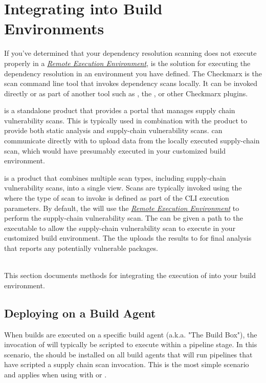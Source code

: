 \chapter{Integrating \scaresolver into Build Environments}\label{chap:ext_build_env}

If you've determined that your dependency resolution scanning does not execute properly
in a \hyperref[sssec:remote_environment]{\textit{Remote Execution Environment}}, \scaresolver
is the solution for executing the dependency resolution in an environment you have defined.
The Checkmarx \scaresolver is the scan command line tool that invokes 
dependency scans locally.  It can be invoked directly or as part of another
tool such as \cxflow, the \cxonecli, or other Checkmarx plugins.

\cxsca is a standalone product that provides a portal that manages supply chain vulnerability scans.  This is
typically used in combination with the \cxsast product to provide both static analysis and supply-chain vulnerability
scans.  \scaresolver can communicate directly with \cxsca to upload data from the locally executed supply-chain
scan, which would have presumably executed in your customized build environment.

\cxone is a product that combines multiple scan types, including supply-chain vulnerability scans, into a single
view.  Scans are typically invoked using the \cxonecli where the type of scan to invoke is defined as part
of the CLI execution parameters.  By default, the \cxonecli will use the 
\hyperref[sssec:remote_environment]{\textit{Remote Execution Environment}} to perform the supply-chain
vulnerability scan.  The \cxonecli can be given a path to the \scaresolver executable to allow
the supply-chain vulnerability scan to execute in your customized build environment.  The \cxonecli the uploads
the results to \cxone for final analysis that reports any potentially vulnerable packages.


\noindent\\This section documents methods for integrating the execution of \scaresolver into your
build environment.


\section{Deploying on a Build Agent}

When builds are executed on a specific build agent (a.k.a. "The Build Box"),
the invocation of \scaresolver will typically be scripted to execute
within a pipeline stage.  In this scenario, the \scaresolver should be
installed on all build agents that will run pipelines that have scripted
a supply chain scan invocation.  This is the most simple scenario and applies
when using \scaresolver with \cxsca or \cxone.

